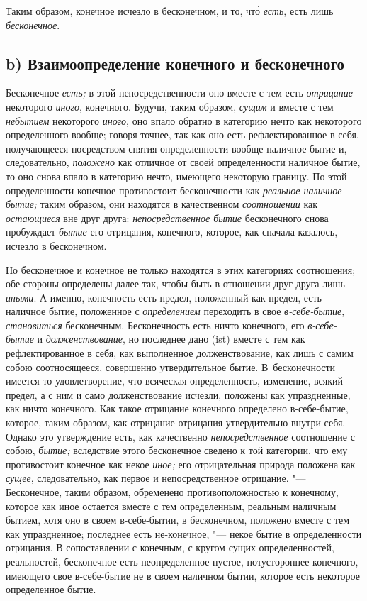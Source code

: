 Таким образом, конечное исчезло в бесконечном,
и то, чт\'{о} {\em есть}, есть лишь {\em бесконечное}.

\subsection[b) Взаимоопределение конечного и бесконечного]%
{b) Взаимоопределение конечного и бесконечного}

Бесконечное {\em есть;} в этой непосредственности оно
вместе с тем есть {\em отрицание} некоторого
{\em иного}, конечного. Будучи, таким образом,
{\em сущим} и вместе с тем {\em небытием} некоторого
{\em иного}, оно впало обратно в категорию нечто как
некоторого определенного вообще; говоря точнее, так как оно есть
рефлектированное в себя, получающееся посредством снятия определенности
вообще наличное бытие и, следовательно, {\em положено}
как отличное от своей определенности наличное бытие, то оно снова впало в
категорию нечто, имеющего некоторую границу. По этой определенности
конечное противостоит бесконечности как {\em реальное
наличное бытие;} таким образом, они находятся в качественном
{\em соотношении} как
{\em остающиеся} вне друг друга:
{\em непосредственное бытие} бесконечного снова
пробуждает {\em бытие} его отрицания, конечного,
которое, как сначала казалось, исчезло в бесконечном.

Но бесконечное и конечное не только находятся в этих категориях соотношения;
обе стороны определены далее так, чтобы быть в отношении друг друга лишь
{\em иными}. А именно, конечность есть предел,
положенный как предел, есть наличное бытие, положенное с
{\em определением} переходить в свое
{\em в-себе-бытие},
{\em становиться} бесконечным. Бесконечность есть ничто
конечного, его {\em в-себе-бытие} и
{\em долженствование}, но последнее дано (ist) вместе с
тем как рефлектированное в себя, как выполненное долженствование, как лишь
с самим собою соотносящееся, совершенно утвердительное бытие.
В~бесконечности имеется то удовлетворение, что всяческая определенность,
изменение, всякий предел, а с ним и само долженствование исчезли, положены
как упраздненные, как ничто конечного. Как такое отрицание конечного
определено в-себе-бытие, которое, таким образом, как отрицание отрицания
утвердительно внутри себя. Однако это утверждение есть, как качественно
{\em непосредственное} соотношение с собою,
{\em бытие;} вследствие этого бесконечное сведено к той
категории, что ему противостоит конечное как некое
{\em иное;} его отрицательная природа положена как
{\em сущее}, следовательно, как первое и
непосредственное отрицание. "--- Бесконечное, таким образом, обременено
противоположностью к конечному, которое как иное остается вместе с тем
определенным, реальным наличным бытием, хотя оно в своем в-себе-бытии, в
бесконечном, положено вместе с тем как упраздненное; последнее есть
не-конечное, "--- некое бытие в определенности отрицания. В сопоставлении с
конечным, с кругом сущих определенностей, реальностей, бесконечное есть
неопределенное пустое, потустороннее конечного, имеющего свое в-себе-бытие
не в своем наличном бытии, которое есть некоторое определенное бытие.

